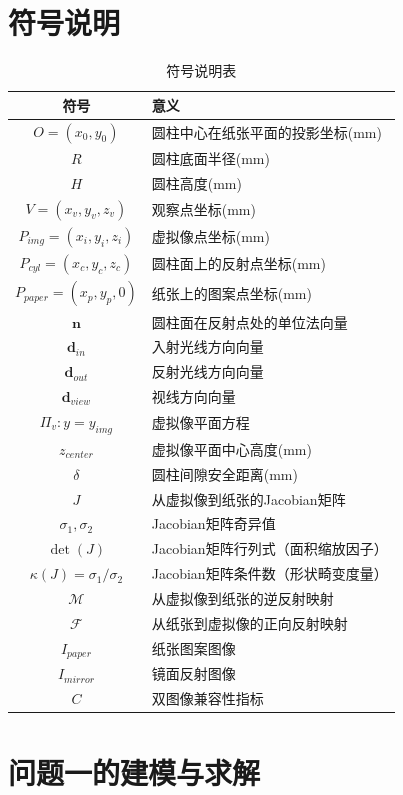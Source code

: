 \documentclass[withoutpreface]{cumcmthesis}
\begin{document}
\section{符号说明}

\begin{table}[H]
\centering
\caption{符号说明表}
\begin{tabular}{cl}
\toprule[1.5pt]
\textbf{符号} & \textbf{意义} \\
\midrule[1pt]
$O=(x_0,y_0)$ & 圆柱中心在纸张平面的投影坐标(mm) \\
$R$ & 圆柱底面半径(mm) \\
$H$ & 圆柱高度(mm) \\
$V=(x_v,y_v,z_v)$ & 观察点坐标(mm) \\
$P_{img}=(x_i,y_i,z_i)$ & 虚拟像点坐标(mm) \\
$P_{cyl}=(x_c,y_c,z_c)$ & 圆柱面上的反射点坐标(mm) \\
$P_{paper}=(x_p,y_p,0)$ & 纸张上的图案点坐标(mm) \\
$\mathbf{n}$ & 圆柱面在反射点处的单位法向量 \\
$\mathbf{d}_{in}$ & 入射光线方向向量 \\
$\mathbf{d}_{out}$ & 反射光线方向向量 \\
$\mathbf{d}_{view}$ & 视线方向向量 \\
$\Pi_v: y=y_{img}$ & 虚拟像平面方程 \\
$z_{center}$ & 虚拟像平面中心高度(mm) \\
$\delta$ & 圆柱间隙安全距离(mm) \\
$J$ & 从虚拟像到纸张的Jacobian矩阵 \\
$\sigma_1, \sigma_2$ & Jacobian矩阵奇异值 \\
$\det(J)$ & Jacobian矩阵行列式（面积缩放因子） \\
$\kappa(J)=\sigma_1/\sigma_2$ & Jacobian矩阵条件数（形状畸变度量） \\
$\mathcal{M}$ & 从虚拟像到纸张的逆反射映射 \\
$\mathcal{F}$ & 从纸张到虚拟像的正向反射映射 \\
$I_{paper}$ & 纸张图案图像 \\
$I_{mirror}$ & 镜面反射图像 \\
$C$ & 双图像兼容性指标 \\
\bottomrule[1.5pt]
\end{tabular}
\end{table}

\section{问题一的建模与求解}
\end{document}
